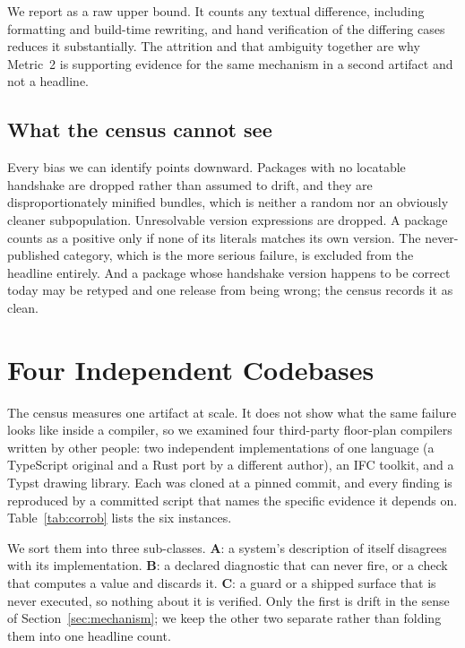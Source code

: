 \documentclass[10pt,journal,compsoc]{IEEEtran}
\begin{document}
We report \factEcoMTwoDifferPct{} as a raw upper bound. It counts any textual difference,
including formatting and build-time rewriting, and hand verification of the differing cases
reduces it substantially. The attrition and that ambiguity together are why Metric~2 is
supporting evidence for the same mechanism in a second artifact and not a headline.

\subsection{What the census cannot see}

Every bias we can identify points downward. Packages with no locatable handshake are dropped
rather than assumed to drift, and they are disproportionately minified bundles, which is
neither a random nor an obviously cleaner subpopulation. Unresolvable version expressions are
dropped. A package counts as a positive only if none of its literals matches its own version.
The never-published category, which is the more serious failure, is excluded from the headline
entirely. And a package whose handshake version happens to be correct today may be retyped and
one release from being wrong; the census records it as clean.

\section{Four Independent Codebases}\label{sec:corroboration}

The census measures one artifact at scale. It does not show what the same failure looks like
inside a compiler, so we examined four third-party floor-plan compilers written by other
people: two independent implementations of one language (a TypeScript original and a Rust
port by a different author), an IFC toolkit, and a Typst drawing library. Each was cloned at a
pinned commit, and every finding is reproduced by a committed script that names the specific
evidence it depends on. Table~\ref{tab:corrob} lists the six instances.

We sort them into three sub-classes. \textbf{A}: a system's description of itself disagrees
with its implementation. \textbf{B}: a declared diagnostic that can never fire, or a check that
computes a value and discards it. \textbf{C}: a guard or a shipped surface that is never
executed, so nothing about it is verified. Only the first is drift in the sense of
Section~\ref{sec:mechanism}; we keep the other two separate rather than folding them into one
headline count.
\end{document}
